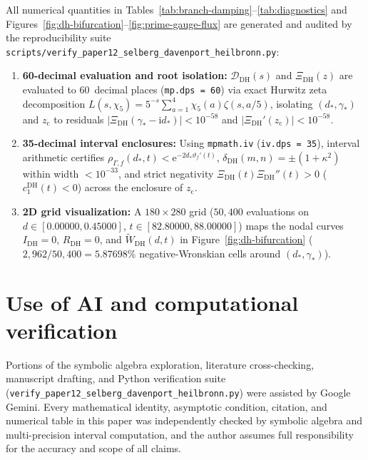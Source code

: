 \documentclass[11pt,reqno]{amsart}
\theoremstyle{definition}
\theoremstyle{remark}
\numberwithin{equation}{section}
\newcommand{\ii}{\mathrm{i}}
\newcommand{\ee}{\mathrm{e}}
\begin{document}
All numerical quantities in Tables~\ref{tab:branch-damping}--\ref{tab:diagnostics} and Figures~\ref{fig:dh-bifurcation}--\ref{fig:prime-gauge-flux} are generated and audited by the reproducibility suite \nolinkurl{scripts/verify_paper12_selberg_davenport_heilbronn.py}:
\begin{enumerate}[label=(\alph*),leftmargin=2.2em]
  \item \textbf{60-decimal evaluation and root isolation:} $\mathcal{D}_{\mathrm{DH}}(s)$ and $\Xi_{\mathrm{DH}}(z)$ are evaluated to 60~decimal places (\texttt{mp.dps = 60}) via exact Hurwitz zeta decomposition $L(s,\chi_5) = 5^{-s}\sum_{a=1}^{4}\chi_5(a)\zeta(s,a/5)$, isolating $(d_*,\gamma_*)$ and $z_{\mathrm{c}}$ to residuals $|\Xi_{\mathrm{DH}}(\gamma_* - \ii d_*)| < 10^{-58}$ and $|\Xi_{\mathrm{DH}}'(z_{\mathrm{c}})| < 10^{-58}$.
  \item \textbf{35-decimal interval enclosures:} Using \texttt{mpmath.iv} (\texttt{iv.dps = 35}), interval arithmetic certifies $\rho_{\Gamma,f}(d_*,t) < \ee^{-2d_*\vartheta_f'(t)}$, $\delta_{\mathrm{DH}}(m,n) = \pm(1+\kappa^2)$ within width $< 10^{-33}$, and strict negativity $\Xi_{\mathrm{DH}}(t)\Xi_{\mathrm{DH}}''(t) > 0$ ($c_1^{\mathrm{DH}}(t) < 0$) across the enclosure of $z_{\mathrm{c}}$.
  \item \textbf{2D grid visualization:} A $180 \times 280$ grid ($50{,}400$ evaluations on $d \in [0.00000, 0.45000]$, $t \in [82.80000, 88.00000]$) maps the nodal curves $I_{\mathrm{DH}} = 0$, $R_{\mathrm{DH}} = 0$, and $\widetilde{W}_{\mathrm{DH}}(d,t)$ in Figure~\ref{fig:dh-bifurcation} ($2{,}962 / 50{,}400 = 5.87698\%$ negative-Wronskian cells around $(d_*,\gamma_*)$).
\end{enumerate}

\section*{Use of AI and computational verification}

Portions of the symbolic algebra exploration, literature cross-checking, manuscript drafting, and Python verification suite (\nolinkurl{verify_paper12_selberg_davenport_heilbronn.py}) were assisted by Google Gemini. Every mathematical identity, asymptotic condition, citation, and numerical table in this paper was independently checked by symbolic algebra and multi-precision interval computation, and the author assumes full responsibility for the accuracy and scope of all claims.
\end{document}
